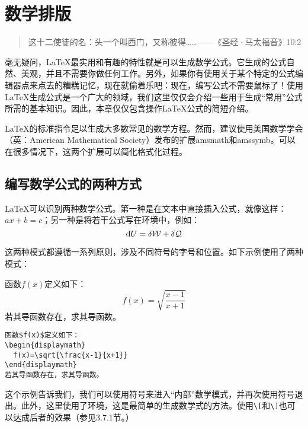 \chapter{数学排版}

\begin{quote}
  这十二使徒的名：头一个叫西门，又称彼得……——《圣经·马太福音》10:2
\end{quote}

毫无疑问，\LaTeX 最实用和有趣的特性就是可以生成数学公式。它生成的公式自然、美观，并且不需要你做任何工作。另外，如果你有使用关于某个特定的公式编辑器点来点去的糟糕记忆，现在就偷着乐吧：现在，编写公式不需要鼠标了！使用\LaTeX 生成公式是一个广大的领域，我们这里仅仅会介绍一些用于生成“常用”公式所需的基本知识。因此，本章仅仅包含操作\LaTeX 公式的简短介绍。

\begin{ii}
\LaTeX 的标准指令足以生成大多数常见的数学方程。然而，建议使用美国数学学会（英：American Mathematical Society）发布的扩展amsmath和amssymb。可以在很多情况下，这两个扩展可以简化格式化过程。
\end{ii}

\section{编写数学公式的两种方式}

\LaTeX 可以识别两种数学公式。第一种是在文本中直接插入公式，就像这样：$ax+b=c$；另一种是将若干公式写在环境中，例如：
$$
{\rm d} U = \delta \mathcal{W} +\delta \mathcal{Q} 
$$

这两种模式都遵循一系列原则，涉及不同符号的字号和位置。如下示例使用了两种模式：

\begin{codelist}[3.1]{
  函数$f(x)$定义如下：
\begin{displaymath}
  f(x)=\sqrt{\frac{x-1}{x+1}}
\end{displaymath}
若其导函数存在，求其导函数。
}\begin{verbatim}
函数$f(x)$定义如下：
\begin{displaymath}
  f(x)=\sqrt{\frac{x-1}{x+1}}
\end{displaymath}
若其导函数存在，求其导函数。
\end{verbatim}
\end{codelist}

这个示例告诉我们，我们可以使用\dm{\$}符号来进入“内部”数学模式，并再次使用\dm{\$}符号退出。此外，这里使用了环境，这是最简单的生成数学式的方法。使用\verb|\[|和\verb|\]|也可以达成后者的效果（参见3.7.1节。）

